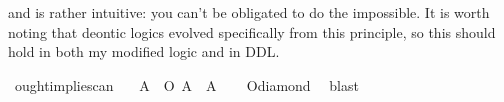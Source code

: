\begin{isabellebody}
\begin{isamarkuptext}
 and is rather intuitive: you can't be obligated to do the impossible. It is worth noting that deontic 
logics evolved \cite{cresswell} specifically from this principle, so this should hold in both my 
modified logic and in DDL.%
\end{isamarkuptext}\isamarkuptrue%
\isamarkupfalse%
\ ought{\isacharunderscore}implies{\isacharunderscore}can{\isacharcolon}\isanewline
\ \ \ {\isachardoublequoteopen}{\isasymforall}A{\isachardot}\ {\isasymTurnstile}\ {\isacharparenleft}O\ {\isacharbraceleft}A{\isacharbraceright}\ \isactrlbold {\isasymrightarrow}\ {\isacharparenleft}{\isasymdiamond}A{\isacharparenright}{\isacharparenright}{\isachardoublequoteclose}\isanewline
%
\isadelimproof
\ \ %
\endisadelimproof
%
\isatagproof
{}\isamarkupfalse%
\ O{\isacharunderscore}diamond\ \isamarkupfalse%
\ blast\isanewline
%
\isanewline
%
\endisatagproof
{\isafoldproof}%
%
\isadelimproof
%
\endisadelimproof
%
\isadelimproof
%
\endisadelimproof
%
\isatagproof
%
\endisatagproof
{\isafoldproof}%
%
\isadelimproof
%
\endisadelimproof
%
\isadelimproof
%
\endisadelimproof
%
\isatagproof
%
\endisatagproof
{\isafoldproof}%
%
\isadelimproof
%
\endisadelimproof
%
\isadelimtheory
%
\endisadelimtheory
%
\isatagtheory
%
\endisatagtheory
{\isafoldtheory}%
%
\isadelimtheory
%
\endisadelimtheory
%
\end{isabellebody}%
\endinput
